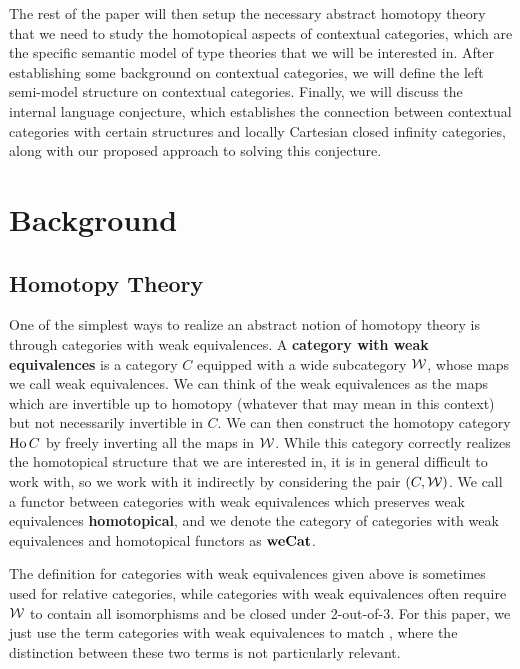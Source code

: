 \documentclass{amsart}
\begin{document}
The rest of the paper will then setup the necessary abstract homotopy theory that we need to study the homotopical aspects of contextual categories, which are the specific semantic model of type theories that we will be interested in. After establishing some background on contextual categories, we will define the left semi-model structure on contextual categories. Finally, we will discuss the internal language conjecture, which establishes the connection between contextual categories with certain structures and locally Cartesian closed infinity categories, along with our proposed approach to solving this conjecture.

\section{Background}

\subsection{Homotopy Theory}
One of the simplest ways to realize an abstract notion of homotopy theory is through categories with weak equivalences. A \textbf{category with weak equivalences} is a category $C$ equipped with a wide subcategory $\mathcal{W}$, whose maps we call weak equivalences. We can think of the weak equivalences as the maps which are invertible up to homotopy (whatever that may mean in this context) but not necessarily invertible in $C$. We can then construct the homotopy category $\operatorname{Ho} C$ by freely inverting all the maps in $\mathcal{W}$. While this category correctly realizes the homotopical structure that we are interested in, it is in general difficult to work with, so we work with it indirectly by considering the pair $(C,\mathcal{W})$. We call a functor between categories with weak equivalences which preserves weak equivalences \textbf{homotopical}, and we denote the category of categories with weak equivalences and homotopical functors as $\operatorname{\mathbf{weCat}}$.

\begin{rem}
    The definition for categories with weak equivalences given above is sometimes used for relative categories, while categories with weak equivalences often require $\mathcal{W}$ to contain all isomorphisms and be closed under 2-out-of-3. For this paper, we just use the term categories with weak equivalences to match \cite{KL18}, where the distinction between these two terms is not particularly relevant.
\end{rem}
\end{document}
